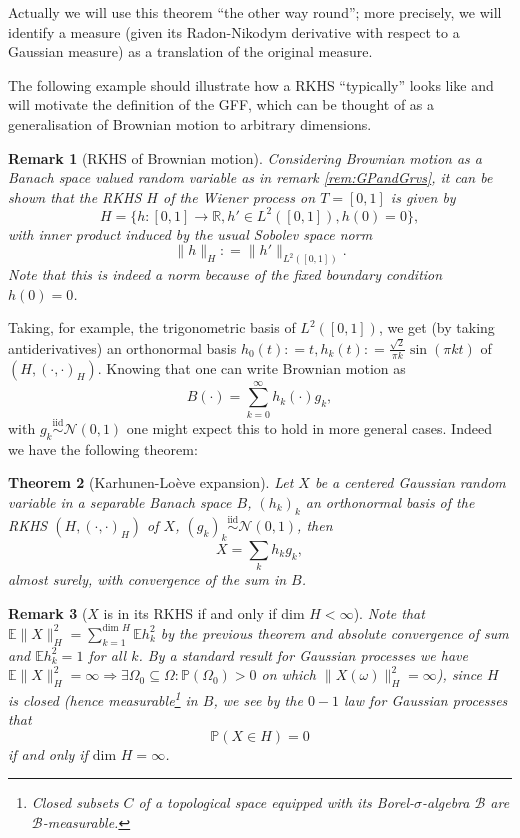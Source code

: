 \documentclass[11pt,reqno]{amsart}
\numberwithin{equation}{section}
\newtheorem{thm}{Theorem}[section]
\newtheorem{rem}[thm]{Remark}
\newcommand{\deq}{\mathrel{\mathop:}=}
\newcommand{\iidnormal}{\mathrel{\stackrel{\text{iid}}{\sim}}\mathcal N(0,1)}
\begin{document}
Actually we will use this theorem ``the other way round''; more precisely, we will identify a measure (given its Radon-Nikodym derivative with respect to a Gaussian measure) as a translation of the original measure.

The following example should illustrate how a RKHS ``typically'' looks like and will motivate the definition of the GFF, which can be thought of as a generalisation of Brownian motion to arbitrary dimensions.

\begin{rem}[RKHS of Brownian motion]\label{rem:RKHSofBM}
	Considering Brownian motion as a Banach space valued random variable as in remark \ref{rem:GPandGrvs}, it can be shown that the RKHS $H$ of the Wiener process on $T=[0,1]$ is given by $$H = \{h:[0,1]\rightarrow\mathbb R, h'\in L^2([0,1]), h(0)=0\},$$ with inner product induced by the usual Sobolev space norm $$\|h\|_H\deq \|h'\|_{L^2([0,1])}.$$
	Note that this is indeed a norm because of the fixed boundary condition $h(0)=0$.
\end{rem}

Taking, for example, the trigonometric basis of $L^2([0,1])$, we get (by taking antiderivatives) an orthonormal basis $h_0(t)\deq t, h_k(t)\deq \frac{\sqrt 2}{\pi k}\sin(\pi kt)$ of $(H,(\cdot,\cdot)_H)$. Knowing that one can write Brownian motion as $$B(\cdot)=\sum_{k=0}^\infty h_k(\cdot)g_k,$$ with $g_k\iidnormal$ one might expect this to hold in more general cases.
Indeed we have the following theorem:

\begin{thm}[Karhunen-Lo\`eve expansion]
	Let $X$ be a centered Gaussian random variable in a separable Banach space $B$, $(h_k)_k$ an orthonormal basis of the RKHS $(H,(\cdot,\cdot)_H)$ of $X$, $(g_k)_k\iidnormal$, then
	$$X=\sum_k h_kg_k,$$
	almost surely, with convergence of the sum in $B$.
\end{thm}

\begin{rem}[$X$ is in its RKHS if and only if dim $H<\infty$]\label{rem:XnotinRKHS}
	Note that $\mathbb E\|X\|_H^2 = \sum_{k=1}^{\text{dim }H}\mathbb E h_k^2$ by the previous theorem and absolute convergence of sum and $\mathbb E h_k^2 = 1$ for all $k$. By a standard result for Gaussian processes we have $\mathbb E\|X\|_H^2=\infty \Rightarrow \exists\Omega_0\subseteq\Omega: \mathbb P(\Omega_0)>0$ on which $\|X(\omega)\|_H^2=\infty$), since $H$ is closed (hence measurable\footnote{Closed subsets $C$ of a topological space equipped with its Borel-$\sigma$-algebra $\mathcal B$ are $\mathcal B$-measurable.} in $B$, we see by the $0-1$ law for Gaussian processes that $$\mathbb P(X\in H)=0$$
	if and only if $\text{dim }H=\infty$.
\end{rem}
\end{document}
